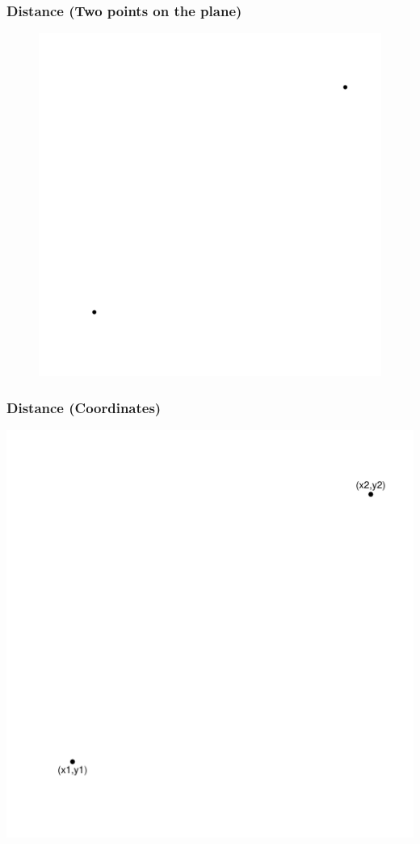 \documentclass[xcolor=x11names,compress]{beamer}\usepackage[]{graphicx}\usepackage[]{color}
\newenvironment{knitrout}{}{} %
\begin{document}
\begin{frame}[plain]
  \frametitle{Distance (Two points on the plane)}
\begin{figure}
  \centering  
\begin{knitrout}\tiny
{}\color{fgcolor}

{\centering \includegraphics[width=.6\linewidth]{figure/beamer-dist1-1} 

}



\end{knitrout}
\end{figure}
\end{frame}


\begin{frame}[plain]
  \frametitle{Distance (Coordinates)}

\begin{knitrout}\tiny
{}\color{fgcolor}

{\centering \includegraphics[width=.6\linewidth]{figure/beamer-dist2-1} 

}



\end{knitrout}

\end{frame}
\end{document}
